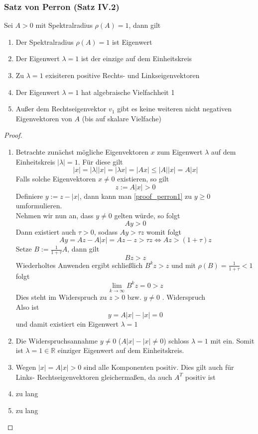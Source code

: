 \documentclass[]{article}
\begin{document}
\subsubsection*{Satz von Perron (Satz IV.2)}
Sei $A>0$ mit Spektralradius $\rho(A)=1$, dann gilt
\begin{enumerate}
	\item Der Spektralradius $\rho(A)=1$ ist Eigenwert
	\item Der Eigenwert $\lambda = 1$ ist der einzige auf dem Einheitskreis
	\item Zu $\lambda = 1$ exisiteren positive Rechts- und Linkseigenvektoren
	\item Der Eigenwert $\lambda=1$ hat algebraische Vielfachheit 1
	\item Außer dem Rechtseigenvektor $v_1$ gibt es keine weiteren nicht negativen Eigenvektoren von $A$ (bis auf skalare Vielfache)
\end{enumerate}
\begin{proof}~
	\begin{enumerate}
		\item Betrachte zunächst mögliche Eigenvektoren $x$ zum Eigenwert $\lambda$ auf dem Einheitskreis $|\lambda| = 1$. Für diese gilt
		\begin{equation} \label{proof_perron1}
		|x| = |\lambda| |x| = |\lambda x | = |Ax| \leq |A| |x| = A |x|
		\end{equation} 
		Falls solche Eigenvektoren $x \neq 0$ existieren, so gilt
		\[ z := A |x| > 0 \]
		Definiere $y:=z - |x|$, dann kann man \eqref{proof_perron1} zu
		$y \geq 0$ umformulieren. \\
		Nehmen wir nun an, dass $y \neq 0$ gelten würde, so folgt
		\[ Ay > 0 \]
		Dann existiert auch $\tau>0$, sodass $Ay > \tau z$ womit folgt
		\begin{equation*}
		Ay = Az - A|x| = Az - z > \tau z  \Leftrightarrow Az > (1+\tau) z
		\end{equation*}
		Setze $B := \frac{1}{1+\tau} A$, dann gilt
		\[ Bz > z \]
		Wiederholtes Anwenden ergibt schließlich
		$B^k z > z$ und mit $\rho(B) = \frac{1}{1+\tau} < 1$ folgt
		\[ \lim_{k \to \infty} B^k z = 0 > z \]
		Dies steht im Widerspruch zu $z>0$ bzw. $y \neq 0$ \hfill. Widerspruch \\
		Also ist 
		\[y = A|x| - |x| = 0 \]
		und damit existiert ein Eigenwert $\lambda = 1$
	\item Die Widerspruchsannahme $y \neq 0$ ($A|x| - |x| \neq 0$) schloss $\lambda = 1$ mit ein. Somit ist $\lambda = 1 \in \mathbb{R}$  einziger Eigenwert auf dem Einheitskreis.
	\item Wegen $|x| = A|x| > 0$ sind alle Komponenten positiv. Dies gilt auch für Links- Rechtseigenvektoren gleichermaßen, da auch $A^T$ positiv ist
	\item zu lang
	\item zu lang
\end{enumerate}
\end{proof}
\end{document}
